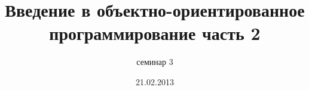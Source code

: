 \documentclass[hyperref={unicode}]{beamer}
\title{Введение в объектно-ориентированное программирование часть 2}
\subtitle{семинар 3}
\date{21.02.2013}
\begin{document}
\frame{\titlepage}


\end{document}

